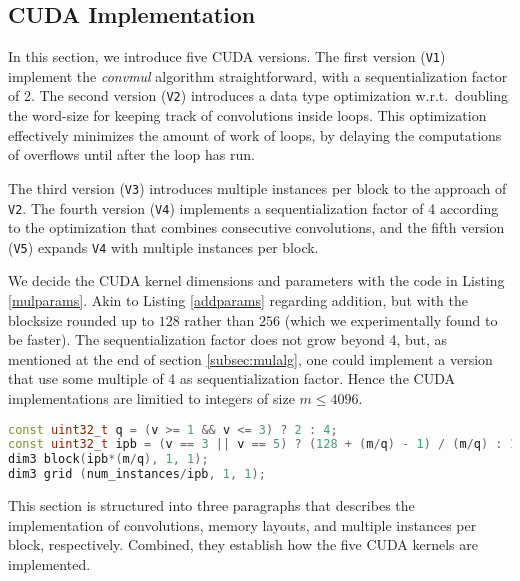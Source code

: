 \subsection{CUDA Implementation}
\label{subsec:mulcud}

In this section, we introduce five CUDA versions. The first version
(\texttt{V1}) implement the \textit{convmul} algorithm straightforward, with a
sequentialization factor of 2. The second version (\texttt{V2}) introduces a
data type optimization w.r.t.\ doubling the word-size for keeping track of
convolutions inside loops. This optimization effectively minimizes the amount of
work of loops, by delaying the computations of overflows until after the loop
has run.

The third version (\texttt{V3}) introduces multiple instances per block to the
approach of \texttt{V2}. The fourth version (\texttt{V4}) implements a
sequentialization factor of 4 according to the optimization that combines
consecutive convolutions, and the fifth version (\texttt{V5}) expands
\texttt{V4} with multiple instances per block.

We decide the CUDA kernel dimensions and parameters with the code in Listing
\ref{mulparams}. Akin to Listing \ref{addparams} regarding addition, but with
the blocksize rounded up to $128$ rather than $256$ (which we experimentally
found to be faster). The sequentialization factor does not grow beyond 4, but,
as mentioned at the end of section \ref{subsec:mulalg}, one could implement a
version that use some multiple of 4 as sequentialization factor. Hence the CUDA
implementations are limitied to integers of size $m\leq4096$.

\begin{lstlisting}[language=CPP,caption={\footnotesize CUDA multiplication parameters and dimensions for version $v$ with size $m$ and $num\_instances$.},label={mulparams}]
const uint32_t q = (v >= 1 && v <= 3) ? 2 : 4;
const uint32_t ipb = (v == 3 || v == 5) ? (128 + (m/q) - 1) / (m/q) : 1;
dim3 block(ipb*(m/q), 1, 1);
dim3 grid (num_instances/ipb, 1, 1);
\end{lstlisting}

This section is structured into three paragraphs that describes the
implementation of convolutions, memory layouts, and multiple instances per
block, respectively. Combined, they establish how the five CUDA kernels are
implemented.

